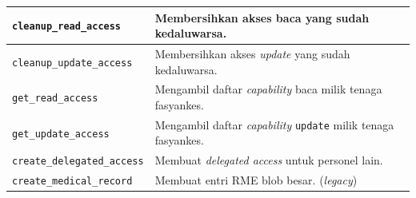 \begin{longtable}{|Y{0.45\textwidth}|Y{0.47\textwidth}|}
	\texttt{cleanup\_read\_access}            & Membersihkan akses baca yang sudah kedaluwarsa.                                        \\ \hline
	\texttt{cleanup\_update\_access}          & Membersihkan akses \textit{update} yang sudah kedaluwarsa.                             \\ \hline
	\texttt{get\_read\_access}                & Mengambil daftar \textit{capability} baca milik tenaga fasyankes.                      \\ \hline
	\texttt{get\_update\_access}              & Mengambil daftar \textit{capability} \texttt{update} milik tenaga fasyankes.           \\ \hline
	\texttt{create\_delegated\_access}        & Membuat \textit{delegated access} untuk personel lain.                                 \\ \hline
	\texttt{create\_medical\_record}          & Membuat entri RME blob besar. (\textit{legacy})                                        \\ \hline
\end{longtable}
